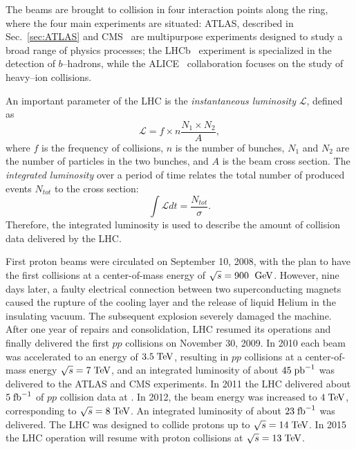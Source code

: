 The beams are brought to collision in four interaction points along
the ring, where the four main experiments are situated: 
ATLAS, described in Sec.~\ref{sec:ATLAS} and CMS~\cite{cms} are
multipurpose experiments designed to study a broad range of physics
processes; the LHCb~\cite{lhcb} experiment is specialized in the
detection of $b$--hadrons, while the ALICE~\cite{alice} collaboration
focuses on the study of heavy--ion collisions.

An important parameter of the LHC is the {\it
  instantaneous luminosity}  $\mathcal L$, defined as
\begin{equation}\label{eq:lumiN}
\mathcal{L}=f\times n\dfrac{N_1\times N_2}{A},
\end{equation} 
where $f$ is the frequency of collisions, $n$ is the number of
bunches, $N_1$ and $N_2$ are the number of particles in the two
bunches, and $A$ is the beam cross section.
The \textit{integrated luminosity} over a period of time relates the
total number of produced events $N_{tot}$ to the cross section:
\begin{equation}\label{eq:intLumi}
\int \mathcal L dt  = \dfrac{N_{tot}}{\sigma}.
\end{equation}
Therefore, the integrated luminosity is used to describe the amount of
collision data delivered by the LHC.

First proton beams were circulated on September 10, 2008, with the
plan to have the first collisions at a center-of-mass energy of
$\sqrt{s}=900~\; \mathrm{GeV}{}$. However, nine days later, a faulty electrical
connection between two superconducting magnets caused the rupture of
the cooling layer and the release of liquid Helium in the insulating
vacuum. The subsequent explosion severely damaged the machine.
After one year of repairs and consolidation, LHC resumed its
operations and finally delivered the first $pp$ collisions on November
30, 2009.
In 2010 each beam was accelerated to an energy of \mbox{$3.5 \; \mathrm{TeV}$}, 
resulting in $pp$ collisions at a center-of-mass energy
\mbox{$\sqrt{s} = 7 \; \mathrm{TeV}$}, and an integrated luminosity of about
$45\; \mathrm{pb}^{-1}$ was delivered to the ATLAS and CMS experiments.
In 2011 the LHC delivered about $5\; \mathrm{fb}^{-1}{}$ of $pp$ collision data at \seventev{}.
In 2012, the beam energy was increased to \mbox{$4 \; \mathrm{TeV}$}, 
corresponding to \mbox{$\sqrt{s} = 8 \; \mathrm{TeV}$}. An integrated luminosity
of about $23\; \mathrm{fb}^{-1}{}$ was delivered.
The LHC was designed to collide protons up to \mbox{$\sqrt{s} = 14
  \; \mathrm{TeV}$}. In 2015 the LHC operation will resume with proton collisions
at \mbox{$\sqrt{s} = 13 \; \mathrm{TeV}$}. 

